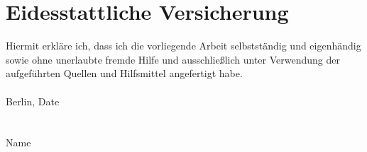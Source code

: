 \section*{Eidesstattliche Versicherung}
Hiermit erkläre ich, dass ich die vorliegende Arbeit selbstständig und eigenhändig sowie ohne 
unerlaubte fremde Hilfe und ausschließlich unter Verwendung der aufgeführten Quellen und Hilfsmittel 
angefertigt habe.\\
\\
Berlin, Date \\
\vspace{1cm}\\
\underline{\hspace{5cm}}\\
Name